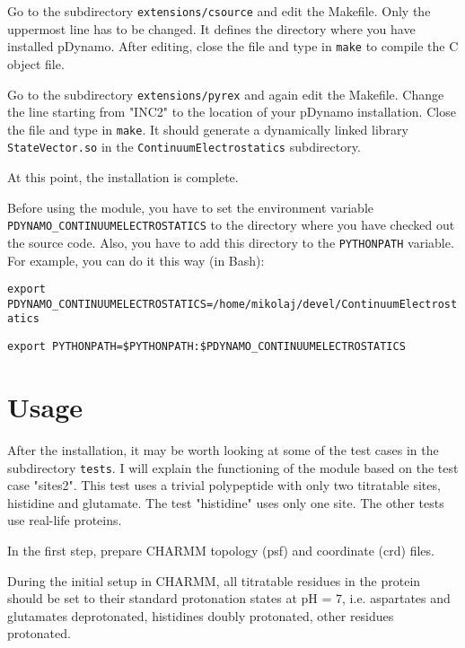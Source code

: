 \documentclass[a4paper,11pt]{article}
\begin{document}
\bigskip
Go to the subdirectory \texttt{extensions/csource} and edit the Makefile. Only the
uppermost line has to be changed. It defines the directory where you have
installed pDynamo. After editing, close the file and type in \texttt{make} to compile
the C object file.

\bigskip
Go to the subdirectory \texttt{extensions/pyrex} and again edit the Makefile. Change
the line starting from "INC2" to the location of your pDynamo installation.
Close the file and type in \texttt{make}. It should generate a dynamically linked 
library \texttt{StateVector.so} in the \texttt{ContinuumElectrostatics} subdirectory.

\bigskip
At this point, the installation is complete.

\bigskip
Before using the module, you have to set the environment variable\\
\texttt{PDYNAMO\_CONTINUUMELECTROSTATICS} to the directory where you have checked out 
the source code. Also, you have to add this directory to the \texttt{PYTHONPATH}
variable. For example, you can do it this way (in Bash):

\bigskip
\texttt{export \\PDYNAMO\_CONTINUUMELECTROSTATICS=/home/mikolaj/devel/ContinuumElectrostatics}

\texttt{export PYTHONPATH=\$PYTHONPATH:\$PDYNAMO\_CONTINUUMELECTROSTATICS}


\section{Usage}
After the installation, it may be worth looking at some of the test cases in 
the subdirectory \texttt{tests}. I will explain the functioning of the module based 
on the test case "sites2". This test uses a trivial polypeptide with only two
titratable sites, histidine and glutamate. The test "histidine" uses only one
site. The other tests use real-life proteins.

\bigskip
In the first step, prepare CHARMM topology (psf) and coordinate (crd) files. 

\bigskip
During the initial setup in CHARMM, all titratable residues in the protein 
should be set to their standard protonation states at pH = 7, i.e. aspartates 
and glutamates deprotonated, histidines doubly protonated, other residues 
protonated.


\end{document}
